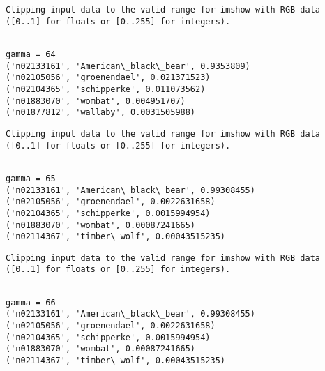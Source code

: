 \documentclass[11pt]{article}
\begin{document}
    \begin{Verbatim}[commandchars=\\\{\}]
Clipping input data to the valid range for imshow with RGB data ([0..1] for floats or [0..255] for integers).

    \end{Verbatim}

    \begin{Verbatim}[commandchars=\\\{\}]

gamma = 64
('n02133161', 'American\_black\_bear', 0.9353809)
('n02105056', 'groenendael', 0.021371523)
('n02104365', 'schipperke', 0.011073562)
('n01883070', 'wombat', 0.004951707)
('n01877812', 'wallaby', 0.0031505988)

    \end{Verbatim}

    \begin{Verbatim}[commandchars=\\\{\}]
Clipping input data to the valid range for imshow with RGB data ([0..1] for floats or [0..255] for integers).

    \end{Verbatim}

    \begin{Verbatim}[commandchars=\\\{\}]

gamma = 65
('n02133161', 'American\_black\_bear', 0.99308455)
('n02105056', 'groenendael', 0.0022631658)
('n02104365', 'schipperke', 0.0015994954)
('n01883070', 'wombat', 0.00087241665)
('n02114367', 'timber\_wolf', 0.00043515235)

    \end{Verbatim}

    \begin{Verbatim}[commandchars=\\\{\}]
Clipping input data to the valid range for imshow with RGB data ([0..1] for floats or [0..255] for integers).

    \end{Verbatim}

    \begin{Verbatim}[commandchars=\\\{\}]

gamma = 66
('n02133161', 'American\_black\_bear', 0.99308455)
('n02105056', 'groenendael', 0.0022631658)
('n02104365', 'schipperke', 0.0015994954)
('n01883070', 'wombat', 0.00087241665)
('n02114367', 'timber\_wolf', 0.00043515235)

    \end{Verbatim}
\end{document}
